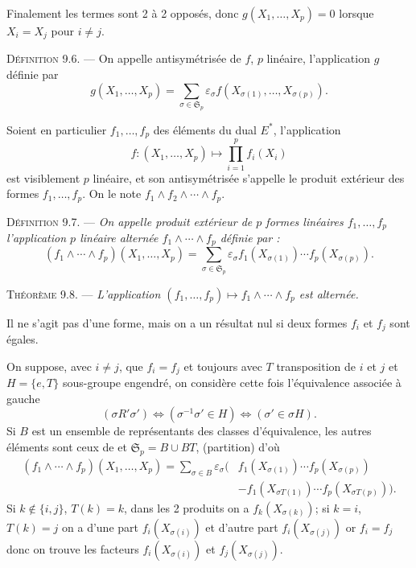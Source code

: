Finalement les termes sont 2 à 2 opposés, donc $g(X_1,\ldots,X_p)=0$ lorsque $X_i=X_j$ pour $i\ne j$. \bookend

\medskip\noindent\textsc{Définition 9.6.} --- On appelle antisymétrisée de $f$, $p$ linéaire, l'application $g$ définie par
\[
g(X_1,\ldots,X_p)=\sum_{\sigma\in\mathfrak S_p}\varepsilon_\sigma f(X_{\sigma(1)},\ldots,X_{\sigma(p)}).
\]

Soient en particulier $f_1,\ldots,f_p$ des éléments du dual $E^*$, l'application
\[
f:(X_1,\ldots,X_p)\longmapsto\prod_{i=1}^pf_i(X_i)
\]
est visiblement $p$ linéaire, et son antisymétrisée s'appelle le produit extérieur des formes $f_1,\ldots,f_p$. On le note $f_1\wedge f_2\wedge\cdots\wedge f_p$.

\medskip\noindent\textsc{Définition 9.7.} --- \emph{On appelle produit extérieur de $p$ formes linéaires $f_1,\ldots,f_p$ l'application $p$ linéaire alternée $f_1\wedge\cdots\wedge f_p$ définie par :}
\[
(f_1\wedge\cdots\wedge f_p)(X_1,\ldots,X_p)=
\sum_{\sigma\in\mathfrak S_p}\varepsilon_\sigma f_1(X_{\sigma(1)})\cdots f_p(X_{\sigma(p)}).
\]

\medskip\noindent\textsc{Théorème 9.8.} --- \emph{L'application $(f_1,\ldots,f_p)\longmapsto f_1\wedge\cdots\wedge f_p$ est alternée.}

Il ne s'agit pas d'une forme, mais on a un résultat nul si deux formes $f_i$ et $f_j$ sont égales.

On suppose, avec $i\ne j$, que $f_i=f_j$ et toujours avec $T$ transposition de $i$ et $j$ et $H=\{e,T\}$ sous-groupe engendré, on considère cette fois l'équivalence associée à gauche
\[
(\sigma\mathrel{R'}\sigma')\Longleftrightarrow(\sigma^{-1}\sigma'\in H)
\Longleftrightarrow(\sigma'\in\sigma H).
\]
Si $B$ est un ensemble de représentants des classes d'équivalence, les autres éléments sont ceux de  et $\mathfrak S_p=B\cup BT$, (partition) d'où
\[
\begin{aligned}
(f_1\wedge\cdots\wedge f_p)(X_1,\ldots,X_p)
=\sum_{\sigma\in B}\varepsilon_\sigma\bigl(&f_1(X_{\sigma(1)})\cdots f_p(X_{\sigma(p)})\\
&-f_1(X_{\sigma T(1)})\cdots f_p(X_{\sigma T(p)})\bigr).
\end{aligned}
\]
Si $k\notin\{i,j\}$, $T(k)=k$, dans les 2 produits on a $f_k(X_{\sigma(k)})$; si $k=i$, $T(k)=j$ on a d'une part $f_i(X_{\sigma(i)})$ et d'autre part $f_i(X_{\sigma(j)})$ or $f_i=f_j$ donc on trouve les facteurs $f_i(X_{\sigma(i)})$ et $f_j(X_{\sigma(j)})$.

